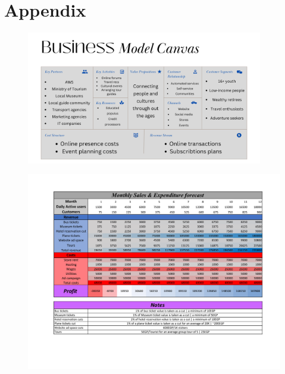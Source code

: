 \documentclass[12pt]{article}
\begin{document}
\section{Appendix}
\begin{figure}
\begin{center}
        \includegraphics[width=0.92\textwidth]{businessModelCanvas.png}
\end{center}
\end{figure}

\begin{figure}
    \begin{center}
        \includegraphics[width=\textwidth]{table1_miniMBA.pdf}
    \end{center}
\end{figure}
\end{document}
